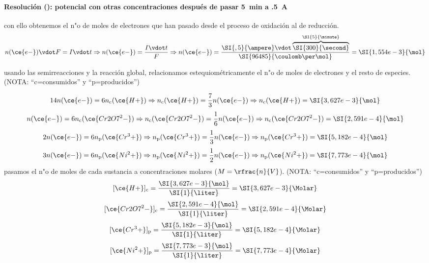 \begin{frame}
	\frametitle{\ejerciciocmd}
	\framesubtitle{Resolución (): potencial con otras concentraciones después de pasar \SI{5}{\minute} a \SI{,5}{\ampere}}
	 con ello obtenemos el n"o de moles de electrones que han pasado desde el proceso de oxidación al de reducción.
	$$
		n(\ce{e-})\vdot F = I\vdot t\Rightarrow n(\ce{e-}) = \frac{I\vdot t}{F}\Rightarrow n(\ce{e-}) =
		\frac{\SI{,5}{\ampere}\vdot\overbrace{\SI{300}{\second}}^{\SI{5}{\minute}}}{\SI{96485}{\coulomb\per\mol}} =
		\SI{1,554e-3}{\mol}
	$$
	\begin{overprint}
			 usando las semirreacciones y la reacción global, relacionamos estequiométricamente el n"o de moles de electrones y el resto de especies. {\footnotesize (NOTA: ``c=consumidos'' y ``p=producidos'')}
			\begin{center}
			\end{center}
				$$
					14n(\ce{e-}) = 6n_{\text{c}}(\ce{H+})\Rightarrow
					n_{\text{c}}(\ce{H+}) = \frac{7}{3}n(\ce{e-})\Rightarrow
					n_{\text{c}}(\ce{H+}) = \SI{3,627e-3}{\mol}
				$$
				$$
					n(\ce{e-}) = 6n_{\text{c}}(\ce{Cr2O7^2-})\Rightarrow
					n_{\text{c}}(\ce{Cr2O7^2-}) = \frac{1}{6}n(\ce{e-})\Rightarrow
					n_{\text{c}}(\ce{Cr2O7^2-}) = \SI{2,591e-4}{\mol}
				$$
				$$
					2n(\ce{e-}) = 6n_{\text{p}}(\ce{Cr^3+})\Rightarrow
					n_{\text{p}}(\ce{Cr^3+}) = \frac{1}{3}n(\ce{e-})\Rightarrow
					n_{\text{p}}(\ce{Cr^3+}) = \SI{5,182e-4}{\mol}
				$$
				$$
					3n(\ce{e-}) = 6n_{\text{p}}(\ce{Ni^2+})\Rightarrow
					n_{\text{p}}(\ce{Ni^2+}) = \frac{1}{2}n(\ce{e-})\Rightarrow
					n_{\text{p}}(\ce{Ni^2+}) = \SI{7,773e-4}{\mol}
				$$
		\onslide<2>
			 pasamos el n"o de moles de cada sustancia a concentraciones molares ($M = \rfrac{n}{V}$). {\footnotesize (NOTA: ``c=consumidos'' y ``p=producidos'')}
				$$
					[\ce{H+}]_{\text{c}} = \frac{\SI{3,627e-3}{\mol}}{\SI{1}{\liter}} = \SI{3,627e-3}{\Molar}
				$$
				$$
					[\ce{Cr2O7^2-}]_{\text{c}} = \frac{\SI{2,591e-4}{\mol}}{\SI{1}{\liter}} = \SI{2,591e-4}{\Molar}
				$$
				$$
					[\ce{Cr^3+}]_{\text{p}} = \frac{\SI{5,182e-3}{\mol}}{\SI{1}{\liter}} = \SI{5,182e-4}{\Molar}
				$$
				$$
					[\ce{Ni^2+}]_{\text{p}} = \frac{\SI{7,773e-3}{\mol}}{\SI{1}{\liter}} = \SI{7,773e-4}{\Molar}
				$$
		\onslide<3>

\end{overprint}
\end{frame}
